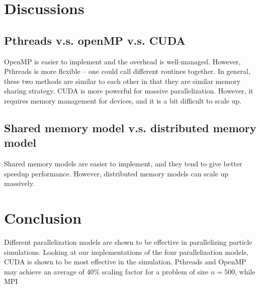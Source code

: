 \documentclass[11pt]{article}
\begin{document}
\section{Discussions}
\subsection{Pthreads v.s. openMP v.s. CUDA}
OpenMP is easier to implement and the overhead is well-managed. However, Pthreads is more flexible -- one could call different routines together. In general, these two methods are similar to each other in that they are similar memory
sharing strategy. CUDA is more powerful for massive parallelization. However, it requires memory management for devices, and it is a bit difficult to scale up.

\subsection{Shared memory model v.s. distributed memory model}
Shared memory models are easier to implement, and they tend to give better speedup performance. However, distributed memory models can scale up massively.

\section{Conclusion}
Different parallelization models are shown to be effective in parallelizing particle simulations. Looking at our implementations of the four parallelization models, CUDA is shown to be most effective in the simulation. Pthreads and OpenMP may achieve an average of 40\% scaling factor for a problem of size $n = 500$, while MPI 



\end{document}
